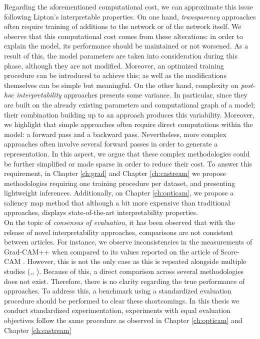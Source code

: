 \noindent Regarding the aforementioned computational cost, we can approximate this issue following 
Lipton's interpretable properties. On one hand, \emph{transparency} approaches often require 
training of additions to the network or of the network itself. We observe that this computational 
cost comes from these alterations: in order to explain the model, its performance should 
be maintained or not worsened. As a result of this, the model parameters are taken into 
consideration during this phase, although they are not modified. Moreover, an optimized training 
procedure can be introduced to achieve this; as well as the modifications themselves can be simple 
but meaningful. On the other hand, complexity on \emph{post-hoc interpretability} approaches 
presents some variance. In particular, since they are built on the already existing parameters 
and computational graph of a model; their combination building up to an approach produces this 
variability. Moreover, we highlight that simple approaches often require direct computations within 
the model: a forward pass and a backward pass. Nevertheless, more complex approaches often involve 
several forward passes in order to generate a representation. In this aspect, we argue that these 
complex methodologies could be further simplified or made sparse in order to reduce their cost. 
To answer this requirement, in Chapter \ref{ch:grad} and Chapter \ref{ch:castream} we propose 
methodologies requiring one training procedure per dataset, and presenting lightweight inferences. 
Additionally, on Chapter \ref{ch:opticam}, we propose a saliency map method that although a bit 
more expensive than traditional approaches, displays state-of-the-art interpretability properties.\\

\noindent On the topic of \emph{consensus of evaluation}, it has been observed that with the 
release of novel interpretability approaches, comparisons are not consistent between articles. For 
instance, we observe inconsistencies in the measurements of Grad-CAM++ 
\autocite{chattopadhay2018grad} when compared to its values reported on the article of Score-CAM 
\autocite{wang2020score}. However, this is not the only case as this is repeated alongside multiple 
studies (\cite{lee2021lfi},\cite{wang2020ss}, \cite{naidu2020cam}). Because of this, a direct 
comparison across several methodologies does not exist. Therefore, there is no clarity 
regarding the true performance of approaches. To address this, a benchmark using a standardized 
evaluation procedure should be performed to clear these shortcomings. In this thesis we conduct 
standardized experimentation, experiments with equal evaluation objectives follow the same 
procedure as observed in Chapter \ref{ch:opticam} and Chapter \ref{ch:castream}\\

